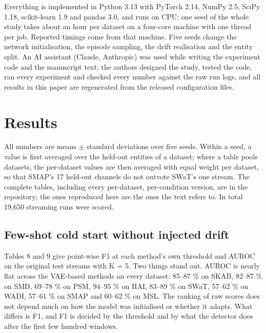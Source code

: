 Everything is implemented in Python 3.13 with PyTorch 2.14, NumPy 2.5, SciPy 1.18, scikit-learn 1.9 and pandas 3.0, and runs on CPU; one seed of the whole study takes about an hour per dataset on a four-core machine with one thread per job. Reported timings come from that machine. Five seeds change the network initialisation, the episode sampling, the drift realisation and the entity split. An AI assistant (Claude, Anthropic) was used while writing the experiment code and the manuscript text; the authors designed the study, tested the code, ran every experiment and checked every number against the raw run logs, and all results in this paper are regenerated from the released configuration files.

\hypertarget{results}{%
\section{Results}\label{results}}

All numbers are means \ensuremath{\pm} standard deviations over five seeds. Within a seed, a value is first averaged over the held-out entities of a dataset; where a table pools datasets, the per-dataset values are then averaged with equal weight per dataset, so that SMAP's 17 held-out channels do not outvote SWaT's one stream. The complete tables, including every per-dataset, per-condition version, are in the repository; the ones reproduced here are the ones the text refers to. In total 19,650 streaming runs were scored.

\hypertarget{few-shot-cold-start-without-injected-drift}{%
\subsection{Few-shot cold start without injected drift}\label{few-shot-cold-start-without-injected-drift}}

Tables 8 and 9 give point-wise F1 at each method's own threshold and AUROC on the original test streams with K = 5. Two things stand out. AUROC is nearly flat across the VAE-based methods on every dataset: 85--87 \% on SKAB, 82--87 \% on SMD, 69--78 \% on PSM, 94--95 \% on HAI, 83--89 \% on SWaT, 57--62 \% on WADI, 57--61 \% on SMAP and 60--62 \% on MSL. The ranking of raw scores does not depend much on how the model was initialised or whether it adapts. What differs is F1, and F1 is decided by the threshold and by what the detector does after the first few hundred windows.

